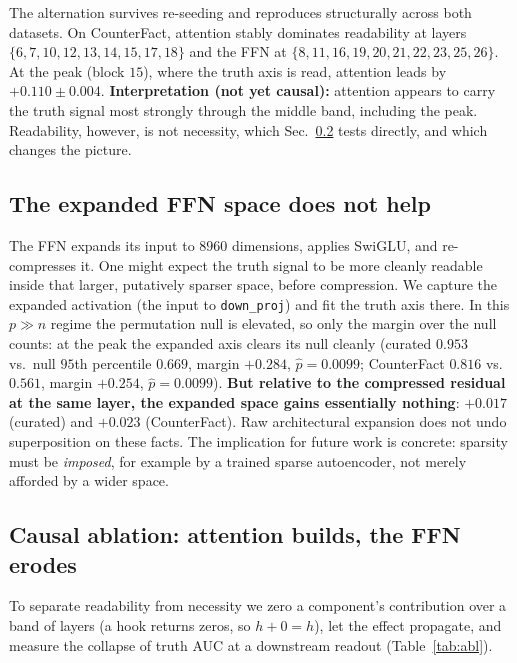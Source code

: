 \documentclass[11pt]{article}
\begin{document}
The alternation survives re-seeding and reproduces structurally across both
datasets. On CounterFact, attention stably dominates readability at layers
$\{6,7,10,12,13,14,15,17,18\}$ and the FFN at
$\{8,11,16,19,20,21,22,23,25,26\}$. At the peak (block $15$), where the truth
axis is read, attention leads by $+0.110 \pm 0.004$. \textbf{Interpretation
(not yet causal):} attention appears to carry the truth signal most strongly
through the middle band, including the peak. Readability, however, is not
necessity, which Sec.~\ref{sec:ablation} tests directly, and which changes
the picture.

\subsection{The expanded FFN space does not help}
\label{sec:expanded}

The FFN expands its input to $8960$ dimensions, applies SwiGLU, and
re-compresses it. One might expect the truth signal to be more cleanly
readable inside that larger, putatively sparser space, before compression. We
capture the expanded activation (the input to \texttt{down\_proj}) and fit
the truth axis there. In this $p \gg n$ regime the permutation null is
elevated, so only the margin over the null counts: at the peak the expanded
axis clears its null cleanly (curated $0.953$ vs.\ null $95$th percentile
$0.669$, margin $+0.284$, $\hat{p} = 0.0099$; CounterFact $0.816$ vs.\
$0.561$, margin $+0.254$, $\hat{p} = 0.0099$). \textbf{But relative to the
compressed residual at the same layer, the expanded space gains essentially
nothing}: $+0.017$ (curated) and $+0.023$ (CounterFact). Raw architectural
expansion does not undo superposition on these facts. The implication for
future work is concrete: sparsity must be \emph{imposed}, for example by a
trained sparse autoencoder, not merely afforded by a wider space.

\subsection{Causal ablation: attention builds, the FFN erodes}
\label{sec:ablation}

To separate readability from necessity we zero a component's contribution
over a band of layers (a hook returns zeros, so $h + 0 = h$), let the effect
propagate, and measure the collapse of truth AUC at a downstream readout
(Table~\ref{tab:abl}).
\end{document}
